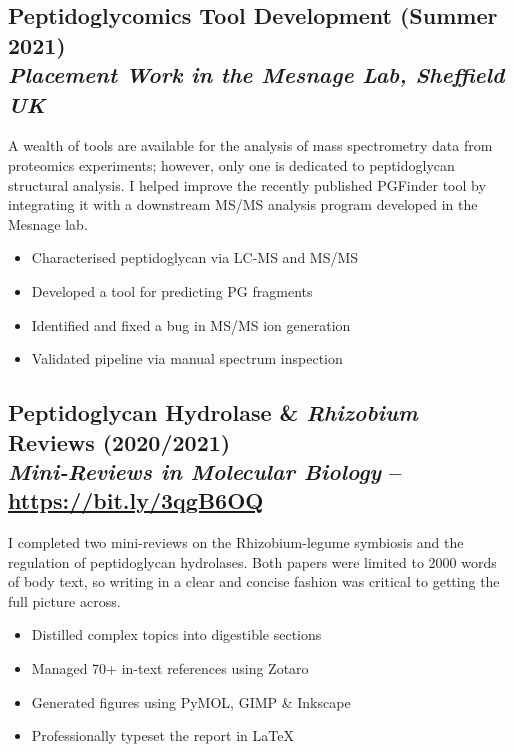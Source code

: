 \documentclass[twocolumn, a4paper, fontsize=9pt, headsepline, footsepline]{scrartcl}
\begin{document}
\subsection*{Peptidoglycomics Tool Development (Summer 2021)\\\textmd{\emph{Placement Work
    in the Mesnage Lab, Sheffield UK}}}
\noindent
A wealth of tools are available for the analysis of mass spectrometry data from
proteomics experiments; however, only one is dedicated to peptidoglycan
structural analysis. I helped improve the recently published PGFinder tool by
integrating it with a downstream MS/MS analysis program developed in the Mesnage
lab.
\begin{itemize}
\item Characterised peptidoglycan via LC-MS and MS/MS
\item Developed a tool for predicting PG fragments
\item Identified and fixed a bug in MS/MS ion generation
\item Validated pipeline via manual spectrum inspection
\end{itemize}

\subsection*{Peptidoglycan Hydrolase \& \emph{Rhizobium} Reviews
  (2020/2021)\\\textmd{\emph{Mini-Reviews in Molecular Biology} – \url{https://bit.ly/3qgB6OQ}}}
\noindent
I completed two mini-reviews on the Rhizobium-legume symbiosis and the
regulation of peptidoglycan hydrolases. Both papers were limited to 2000 words
of body text, so writing in a clear and concise fashion was critical to getting
the full picture across.
\begin{itemize}
\item Distilled complex topics into digestible sections
\item Managed 70+ in-text references using Zotaro
\item Generated figures using PyMOL, GIMP \& Inkscape
\item Professionally typeset the report in \LaTeX
\end{itemize}
\end{document}
